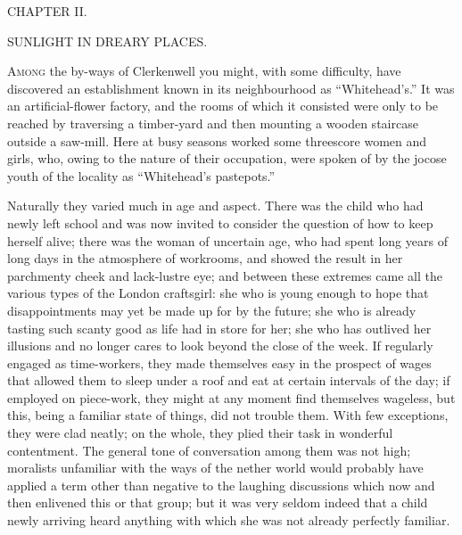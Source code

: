 {}

{CHAPTER II.}

SUNLIGHT IN DREARY PLACES.

\textsc{Among} the by-ways of Clerkenwell you might, with some
difficulty, have discovered an establishment known in its neighbourhood
as ``Whitehead's.'' It was an artificial-flower factory, and the rooms
of which it consisted were only to be reached by traversing a
timber-yard and then mounting a wooden staircase outside a saw-mill.
Here at busy seasons worked some threescore women and girls, who, owing
to the nature of their occupation, were spoken of by the jocose youth of
the locality as ``Whitehead's pastepots.''

Naturally they varied much in age and aspect. There was the child who
had newly left school and was now invited to consider the question of
how to keep herself alive; there was the woman of uncertain age, who
{}had spent long years of long days in the atmosphere of workrooms, and
showed the result in her parchmenty cheek and lack-lustre eye; and
between these extremes came all the various types of the London
craftsgirl: she who is young enough to hope that disappointments may yet
be made up for by the future; she who is already tasting such scanty
good as life had in store for her; she who has outlived her illusions
and no longer cares to look beyond the close of the week. If regularly
engaged as time-workers, they made themselves easy in the prospect of
wages that allowed them to sleep under a roof and eat at certain
intervals of the day; if employed on piece-work, they might at any
moment find themselves wageless, but this, being a familiar state of
things, did not trouble them. With few exceptions, they were clad
neatly; on the whole, they plied their task in wonderful contentment.
The general tone of conversation among them was not high; moralists
unfamiliar with the ways of the nether world would probably have applied
a term other {}than negative to the laughing discussions which now and
then enlivened this or that group; but it was very seldom indeed that a
child newly arriving heard anything with which she was not already
perfectly familiar.

